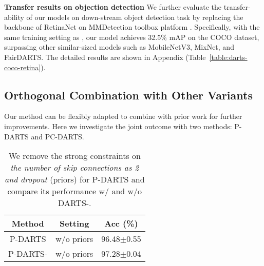 \documentclass{article} \usepackage{iclr2021_conference,times}
\begin{document}
\textbf{Transfer results on objection detection}
We further evaluate the transfer-ability of our models on down-stream object detection task by replacing the backbone of RetinaNet \citep{lin2017focal} on MMDetection toolbox platform \citep{chen2019mmdetection}. Specifically, with the same training setting as \cite{chu2019fair}, our model achieves  32.5\% mAP on the COCO dataset, surpassing other similar-sized models such as MobileNetV3, MixNet, and FairDARTS. The detailed results are shown in Appendix (Table~\ref{table:darts-coco-retina}).

\subsection{Orthogonal Combination with Other Variants}

Our method can be flexibly adapted to combine with prior work for further improvements. Here we investigate the joint outcome with two methods: P-DARTS  and PC-DARTS.

\label{sec:pdarts-discuss}
\begin{comment}
\begin{wraptable}{r}{5.5cm}
	\vspace{-20pt}
	\setlength{\tabcolsep}{1pt}
	\small
	\centering
	\caption{Comparison of P-DARTS removing the strong prior and combining DARTS-. The results are averaged over 3 independent experiments on C10.} 
	\smallskip\begin{tabular}{cp{1cm}p{1cm}c}
		\toprule
		&  \textbf{Remove Prior (M=2)} &  \textbf{With DARTS-} &  \textbf{Acc ($\%$)}\\
		\midrule
		\multirow{2}*{P-DARTS 
		} & \checkmark & $\times$ &  96.48$\pm$0.55 \\
		~    &  \checkmark & \checkmark &97.28$\pm$0.04 \\
		\bottomrule
	\end{tabular}
	\label{tab:pdarts-darts-}
	\vspace{-10pt}
\end{wraptable}
\end{comment}

\begin{wraptable}{r}{5.5cm}
	\vspace{-20pt}
	\setlength{\tabcolsep}{1pt}
	\small
	\centering
	\caption{We remove the strong constraints on \textit{the number of skip connections as 2 and dropout }(priors) for P-DARTS and compare its performance w/ and w/o DARTS-. } 
	\smallskip\begin{tabular}{ccc}
		\toprule
		\textbf{Method} & \textbf{Setting}& \textbf{Acc (\%)} \\
		\midrule
		P-DARTS & w/o priors  & 96.48$\pm$0.55 \\
		P-DARTS- & w/o priors &97.28$\pm$0.04 \\
		\bottomrule
	\end{tabular}
	\label{tab:pdarts-darts-}
	\vspace{-12pt}
\end{wraptable}
\end{document}

